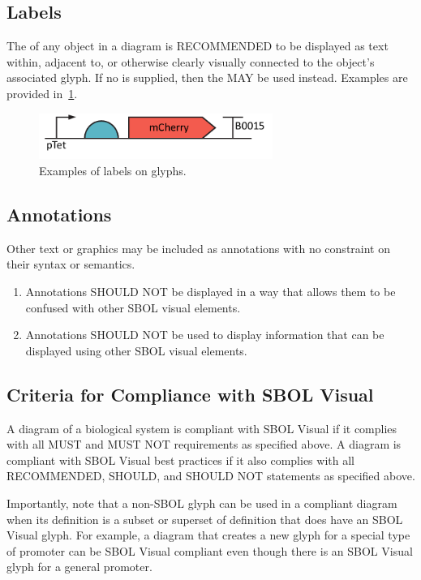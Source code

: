 	
\subsection{Labels}
The  of any object in a diagram is RECOMMENDED to be displayed as text within, adjacent to, or otherwise clearly visually connected to the object's associated glyph.  If no  is supplied, then the  MAY be used instead.
Examples are provided in~\ref{exa:5}.

	\begin{figure}[h!]
	\centering
	\includegraphics[width=3in]{figures/examples/5-labels.pdf}
	\caption{Examples of labels on glyphs.}
	\label{exa:5}
	\end{figure}


\subsection{Annotations}
Other text or graphics may be included as annotations with no constraint on their syntax or semantics.

\begin{enumerate}
\item Annotations SHOULD NOT be displayed in a way that allows them to be confused with other SBOL visual elements.
\item Annotations SHOULD NOT be used to display information that can be displayed using other SBOL visual elements.
\end{enumerate}

\subsection{Criteria for Compliance with SBOL Visual}

A diagram of a biological system is compliant with SBOL Visual if it complies with all MUST and MUST NOT requirements as specified above.
A diagram is compliant with SBOL Visual best practices if it also complies with all RECOMMENDED, SHOULD, and SHOULD NOT statements as specified above.

Importantly, note that a non-SBOL glyph can be used in a compliant
diagram when its definition is a subset or superset of definition that
does have an SBOL Visual glyph.  For example, a diagram that creates a
new glyph for a special type of promoter can be SBOL Visual compliant
even though there is an SBOL Visual glyph for a general promoter.

